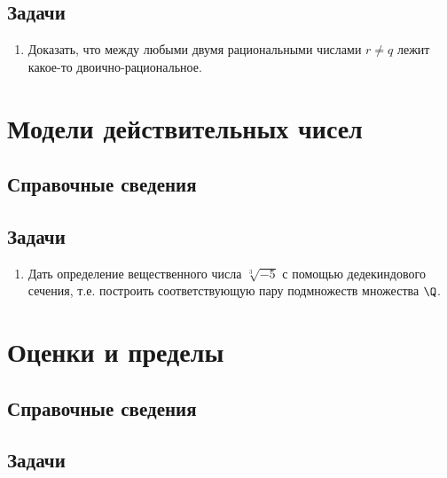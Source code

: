 \subsection*{Задачи}

\begin{enumerate}
\item Доказать, что между любыми двумя рациональными числами $r\ne q$ лежит какое-то двоично-рациональное.
\end{enumerate}


\section{Модели действительных чисел}

\subsection*{Справочные сведения}

\subsection*{Задачи}

\begin{enumerate}
\item Дать определение вещественного числа $\sqrt[3]{-5}$ с помощью дедекиндового сечения, т.е. построить соответствующую пару подмножеств множества $\Q$.
\end{enumerate}




\begin{comment}
\chapter{16. Элементы математического анализа}
\end{comment}

\section{Оценки и пределы}

\subsection*{Справочные сведения}

\subsection*{Задачи}


